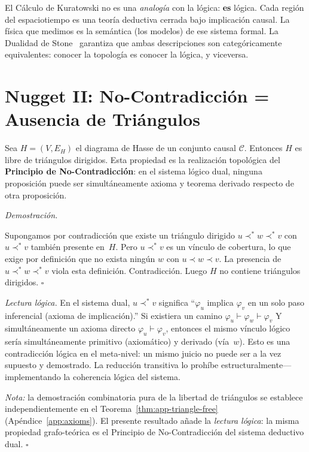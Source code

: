 \documentclass[11pt, a4paper, openany]{book}
\newcommand{\covers}{\prec^{\!*}}
\renewenvironment{proof}[1][Demostraci\'on]{%
  \par\noindent\textit{#1.}\quad
}{\hfill$\square$\par\medskip}
\begin{document}
\begin{result}[title={El Espaciotiempo es un Sistema Deductivo}]
\label{res:stone-deductive-system}
El C\'alculo de Kuratowski no es una \emph{analog\'ia} con la l\'ogica:
\textbf{es} l\'ogica. Cada regi\'on del espaciotiempo es una teor\'ia
deductiva cerrada bajo implicaci\'on causal. La f\'isica que medimos es
la sem\'antica (los modelos) de ese sistema formal. La Dualidad de
Stone~\cite{stone1936} garantiza que ambas descripciones son
categ\'oricamente equivalentes: conocer la topolog\'ia es conocer la
l\'ogica, y viceversa.
\end{result}

\section{Nugget II: No-Contradicci\'on = Ausencia de Tri\'angulos}

\begin{theorem}
\label{thm:non-contradiction}
Sea $H = (V, E_H)$ el diagrama de Hasse de un conjunto causal
$\mathcal{C}$. Entonces $H$ es libre de tri\'angulos dirigidos.
Esta propiedad es la realizaci\'on topol\'ogica del \textbf{Principio
de No-Contradicci\'on}: en el sistema l\'ogico dual, ninguna
proposici\'on puede ser simult\'aneamente axioma y teorema derivado
respecto de otra proposici\'on.
\end{theorem}

\begin{proof}
Supongamos por contradicci\'on que existe un tri\'angulo dirigido
$u \covers w \covers v$ con $u \covers v$ tambi\'en
presente en~$H$. Pero $u \covers v$ es un v\'inculo de cobertura,
lo que exige por definici\'on que no exista ning\'un $w$ con
$u \prec w \prec v$. La presencia de $u \covers w \covers v$
viola esta definici\'on. Contradicci\'on. Luego $H$ no contiene
tri\'angulos dirigidos. $\square$

\medskip\noindent
\textit{Lectura l\'ogica.} En el sistema dual, $u \covers v$
significa ``$\varphi_u$ implica $\varphi_v$ en un solo paso
inferencial (axioma de implicaci\'on).'' Si existiera un camino
$\varphi_u \vdash \varphi_w \vdash \varphi_v$ Y simult\'aneamente un
axioma directo $\varphi_u \vdash \varphi_v$, entonces el mismo
v\'inculo l\'ogico ser\'ia simult\'aneamente primitivo (axiom\'atico) y
derivado (v\'ia~$w$). Esto es una contradicci\'on l\'ogica en el
meta-nivel: un mismo juicio no puede ser a la vez supuesto y
demostrado. La reducci\'on transitiva lo proh\'ibe
estructuralmente---implementando la coherencia l\'ogica del sistema.

\smallskip\noindent
\textit{Nota:} la demostraci\'on combinatoria pura de la libertad de
tri\'angulos se establece independientemente en el
Teorema~\ref{thm:app-triangle-free} (Ap\'endice~\ref{app:axioms}).
El presente resultado a\~nade la \emph{lectura l\'ogica}: la misma
propiedad grafo-te\'orica es el Principio de No-Contradicci\'on del
sistema deductivo dual.
\end{proof}
\end{document}
